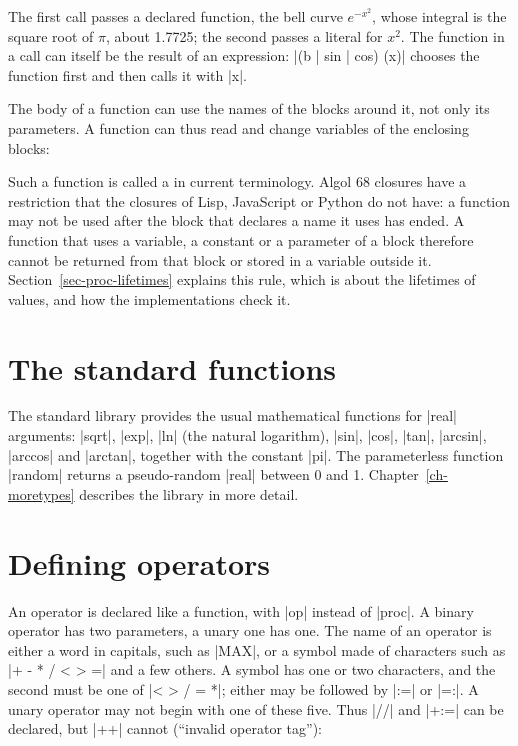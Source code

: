 
The first call passes a declared function, the bell curve
$e^{-x^2}$, whose integral is the square root of $\pi$, about 1.7725; the second
passes a literal for $x^2$. The function in a call can itself be the
result of an expression: \code|(b | sin | cos) (x)| chooses the function
first and then calls it with \code|x|.

The body of a function can use the names of the blocks around it, not
only its parameters. A function can thus read and change variables of
the enclosing blocks:


Such a function is called a  in current terminology. Algol
68 closures have a restriction that the closures of Lisp, JavaScript or
Python do not have: a function may not be used after the block that
declares a name it uses has ended. A function that uses a variable, a
constant or a parameter of a block therefore cannot be returned from
that block or stored in a variable outside it.
Section~\ref{sec-proc-lifetimes} explains this rule, which is about the
lifetimes of values, and how the implementations check it.

\section{The standard functions}\label{sec-std-procs}

The standard library provides the usual mathematical functions for
\code|real| arguments: \code|sqrt|, \code|exp|, \code|ln| (the natural
logarithm), \code|sin|, \code|cos|, \code|tan|, \code|arcsin|,
\code|arccos| and \code|arctan|, together with the constant \code|pi|.
The parameterless function \code|random| returns a pseudo-random
\code|real| between 0 and 1. Chapter~\ref{ch-moretypes} describes the library in more
detail.

\section{Defining operators}\label{sec-op-decl}

An operator is declared like a function, with \code|op| instead of
\code|proc|. A binary operator has two parameters, a unary one has one.
The name of an operator is either a word in capitals, such as
\code|MAX|, or a symbol made of characters such as \code|+ - * / < > =|
and a few others. A symbol has one or two characters, and the second
must be one of \code|< > / = *|; either may be followed by \code|:=|
or \code|=:|. A unary operator may not begin with one of these five. Thus \code|//| and \code|+:=| can be declared, but
\code|++| cannot (``invalid operator tag''):

